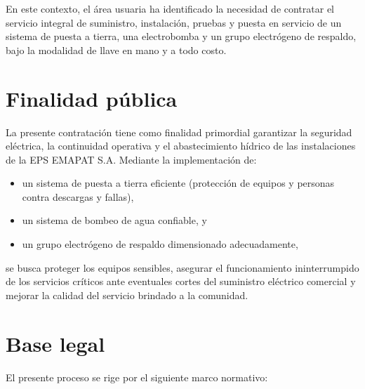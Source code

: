 \documentclass[12pt,a4paper]{article}
\begin{document}
En este contexto, el área usuaria ha identificado la necesidad de contratar el servicio integral de suministro, instalación, pruebas y puesta en servicio de un sistema de puesta a tierra, una electrobomba y un grupo electrógeno de respaldo, bajo la modalidad de llave en mano y a todo costo.

\section{Finalidad pública}

La presente contratación tiene como finalidad primordial garantizar la seguridad eléctrica, la continuidad operativa y el abastecimiento hídrico de las instalaciones de la EPS EMAPAT S.A. Mediante la implementación de:
\begin{itemize}
  \item un sistema de puesta a tierra eficiente (protección de equipos y personas contra descargas y fallas),
  \item un sistema de bombeo de agua confiable, y
  \item un grupo electrógeno de respaldo dimensionado adecuadamente,
\end{itemize}
se busca proteger los equipos sensibles, asegurar el funcionamiento ininterrumpido de los servicios críticos ante eventuales cortes del suministro eléctrico comercial y mejorar la calidad del servicio brindado a la comunidad.

\section{Base legal}

El presente proceso se rige por el siguiente marco normativo:
\end{document}
